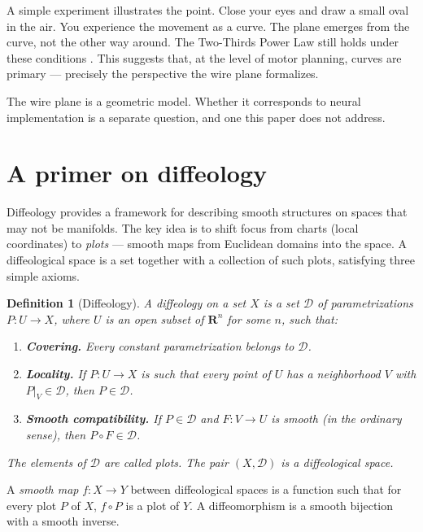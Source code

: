 \documentclass[10pt,letterpaper,reqno]{amsart}
\newcommand{\RR}{\mathbf{R}}
\newcommand{\cD}{\mathcal{D}}
\newtheorem*{definition}{Definition}
\begin{document}
  A simple experiment illustrates the point.
  Close your eyes and draw a small oval in the air.
  You experience the movement as a curve.
  The plane emerges from the curve, not the other way around.
  The Two-Thirds Power Law still holds under these conditions \cite{KF15}.
  This suggests that, at the level of motor planning,
  curves are primary --- precisely the perspective the wire plane formalizes.
  
  The wire plane is a geometric model.
  Whether it corresponds to neural implementation is a separate question,
  and one this paper does not address.
  
  
  \section{A primer on diffeology}
  
  Diffeology provides a framework for describing smooth structures on spaces that may not be manifolds.
  The key idea is to shift focus from charts (local coordinates) to \emph{plots} — smooth maps from Euclidean domains into the space.
  A diffeological space is a set together with a collection of such plots, satisfying three simple axioms.
  
  \begin{definition}[Diffeology]
    A \emph{diffeology} on a set $X$ is a set $\cD$ of parametrizations $P: U \to X$,
    where $U$ is an open subset of $\RR^n$ for some $n$,
    such that:
    \begin{enumerate}
      \item \textbf{Covering.} Every constant parametrization belongs to $\cD$.
      \item \textbf{Locality.} If $P: U \to X$ is such that every point of $U$ has a neighborhood $V$ with $P|_V \in \cD$, then $P \in \cD$.
      \item \textbf{Smooth compatibility.} If $P \in \cD$ and $F: V \to U$ is smooth (in the ordinary sense), then $P \circ F \in \cD$.
    \end{enumerate}
    The elements of $\cD$ are called \emph{plots}. The pair $(X,\cD)$ is a \emph{diffeological space}.
  \end{definition}
  
  A \emph{smooth map} $f: X \to Y$ between diffeological spaces is a function such that for every plot $P$ of $X$, $f \circ P$ is a plot of $Y$.
  A diffeomorphism is a smooth bijection with a smooth inverse.
  
\end{document}
